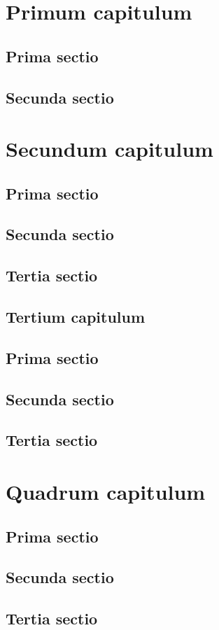 \documentclass[12pt,a4paper]%
    {report}
\begin{document}
\dominitoc \tableofcontents
\chapter{Primum capitulum}
\begin{multicols}{2}[\minitoc]
\section{Prima sectio}
\lipsum[1-2]
\section{Secunda sectio}
\lipsum[3-4]
\end{multicols}
\chapter{Secundum capitulum}
\begin{multicols}{2}[\minitoc]
\section{Prima sectio}
\lipsum[5-6]
\section{Secunda sectio}
\lipsum[7-8]
\section{Tertia sectio}
\lipsum[9-10]
\end{multicols}
\begin{multicols}{2}
\chapter{Tertium capitulum}
\minitoc
\section{Prima sectio}
\lipsum[11-12]
\section{Secunda sectio}
\lipsum[13-14]
\section{Tertia sectio}
\lipsum[15-16]
\end{multicols}
\chapter{Quadrum capitulum}
\begin{multicols}{2}
\minitoc
\section{Prima sectio}
\lipsum[16-17]
\section{Secunda sectio}
\lipsum[18-19]
\section{Tertia sectio}
\lipsum[20-21]
\end{multicols}
\end{document}
